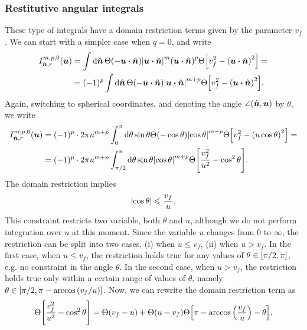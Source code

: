 \documentclass[aps,prl,preprint,groupedaddress,10pt]{revtex4-2}
\begin{document}
\subsubsection{Restitutive angular integrals}
These type of integrals have a domain restriction terms given by the parameter $v_f$.
We can start with a simpler case when $q=0$, and write
\begin{equation}
    \begin{split}
        I_{\bn,r}^{m,p,0}(\bu)&=\int\dd{\bn}\Theta\pqty{-\bu\vdot\bn}
        \abs{\bu\vdot\bn}^m\pqty{\bu\vdot\bn}^p
        \Theta\bqty{v_f^2-\pqty{\bu\vdot\bn}^2}=\\
        &=(-1)^p\int\dd{\bn}\Theta\pqty{-\bu\vdot\bn}
        \abs{\bu\vdot\bn}^{m+p}
        \Theta\bqty{v_f^2-\pqty{\bu\vdot\bn}^2}.
    \end{split}
\end{equation}
Again, switching to spherical coordinates, and denoting the angle $\angle(\hat{\vb*{n}},\vb*{u})$ by
$\theta$, we write
\begin{equation}
    \begin{split}
        I_{\bn,r}^{m,p,0}(\bu)&=(-1)^p\cdot 2\pi u^{m+p}\int_0^{\pi}\dd{\theta}\sin\theta
        \Theta\pqty{-\cos\theta}\abs{\cos\theta}^{m+p}
        \Theta\bqty{v_f^2-\pqty{u\cos\theta}^2}=\\
        &=(-1)^p\cdot 2\pi u^{m+p}\int_{\pi/2}^{\pi}\dd{\theta}\sin\theta
        \abs{\cos\theta}^{m+p}\Theta\bqty{\frac{v_f^2}{u^2}-\cos^2\theta}.
    \end{split}
\end{equation}
The domain restriction implies
\begin{equation}
    \abs{\cos\theta}\leqslant\frac{v_f}{u}.
\end{equation}
This constraint restricts two variable, both $\theta$ and $u$, although we do not perform
integration over $u$ at this moment. Since the variable $u$ changes from $0$ to $\infty$,
the restriction can be split into two cases, (i) when $u\leqslant v_f$, (ii) when
$u>v_f$. In the first case, when $u\leqslant v_f$, the restriction holds true
for any values of $\theta\in\bqty{\pi/2,\pi}$, e.g. no constraint in the angle $\theta$.
In the second case, when $u>v_f$, the restriction holds true only within a certain
range of values of $\theta$, namely $\theta\in\bqty{\pi/2,\pi-\arccos\pqty{v_f/u}}$.
Now, we can rewrite the domain restriction term as
\begin{equation}
    \Theta\bqty{\frac{v_f^2}{u^2}-\cos^2\theta}=
    \Theta\pqty{v_f-u}+\Theta\pqty{u-v_f}
    \Theta\bqty{\pi-\arccos\pqty{\frac{v_f}{u}}-\theta}.
\end{equation}
\end{document}
